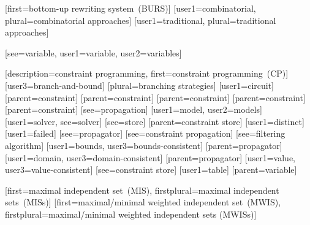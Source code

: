 %
        [first=bottom-up rewriting system~(BURS)]
%
        [user1={combinatorial}, plural={combinatorial approaches}]
%
        [user1={traditional}, plural={traditional approaches}]

[see={variable}, user1={variable}, user2={variables}]

%
        [description={constraint programming},
         first={constraint programming~(CP)}]
[user3={branch-and-bound}]
[plural={branching strategies}]
[user1={circuit}]
[parent={constraint}]
[parent={constraint}]
[parent={constraint}]
[parent={constraint}]
[parent={constraint}]
[see={propagation}]
[user1={model}, user2={models}]
[user1={solver}, see={solver}]
[see={store}]
[parent={constraint store}]
[user1={distinct}]
[user1={failed}]
[see={propagator}]
[see={constraint propagation}]
[see={filtering algorithm}]
[user1={bounds}, user3={bounds-consistent}]
[parent={propagator}]
[user1={domain}, user3={domain-consistent}]
[parent={propagator}]
[user1={value}, user3={value-consistent}]
[see={constraint store}]
[user1={table}]
[parent={variable}]


%
        [first={maximal independent set~(MIS)},
         firstplural={maximal independent sets~(MISs)}]
%
        [first={maximal/minimal weighted independent set~(MWIS)},
         firstplural={maximal/minimal weighted independent sets (MWISs)}]

